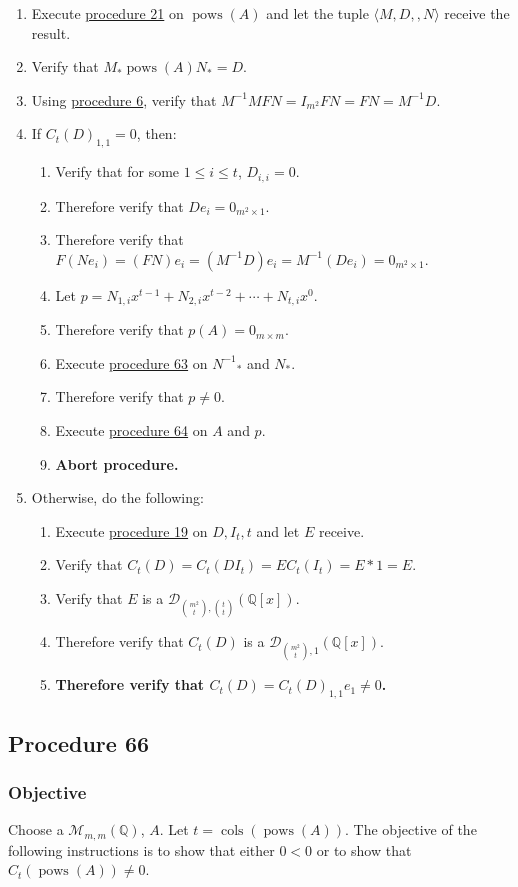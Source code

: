 \documentclass[twocolumn]{article}
\DeclareMathOperator{\pows}{pows}
\DeclareMathOperator{\cols}{cols}
\newcommand{\procedure}[2][]{\subsection*{Procedure #2 \ifthenelse{\equal{#1}{}}{}{(#1)}}\label{sec:procedure #2}}
\newcommand{\objective}{\subsubsection*{Objective}}
\begin{document}
				\begin{enumerate}
					\item Execute \hyperref[sec:procedure 21]{procedure 21} on $\pows(A)$ and let the tuple $\langle M,D,,N\rangle$ receive the result.
					\item Verify that $M_*\pows(A)N_*=D$.
					\item Using \hyperref[sec:procedure 6]{procedure 6}, verify that $M^{-1}MFN=I_{m^2}FN=FN=M^{-1}D$.
					\item If ${C_t(D)}_{1,1}=0$, then:
					\begin{enumerate}
						\item Verify that for some $1\le i\le t$, $D_{i,i}=0$.
						\item Therefore verify that $De_i=0_{m^2\times 1}$.
						\item Therefore verify that $F(Ne_i)=(FN)e_i=(M^{-1}D)e_i=M^{-1}(De_i)=0_{m^2\times 1}$.
						\item Let $p=N_{1,i}x^{t-1}+N_{2,i}x^{t-2}+\cdots+N_{t,i}x^0$.
						\item Therefore verify that $p(A)=0_{m\times m}$.
						\item Execute \hyperref[sec:procedure 63]{procedure 63} on ${N^{-1}}_*$ and $N_*$.
						\item Therefore verify that $p\ne 0$.
						\item Execute \hyperref[sec:procedure 64]{procedure 64} on $A$ and $p$.
						\item \textbf{Abort procedure.}
					\end{enumerate}
					\item Otherwise, do the following:
					\begin{enumerate}
						\item Execute \hyperref[sec:procedure 19]{procedure 19} on $D,I_t,t$ and let $E$ receive.
						\item Verify that $C_t(D)=C_t(DI_t)=EC_t(I_t)=E*1=E$.
						\item Verify that $E$ is a $\mathcal{D}_{\binom{m^2}{t},\binom{t}{t}}(\mathbb{Q}[x])$.
						\item Therefore verify that $C_t(D)$ is a $\mathcal{D}_{\binom{m^2}{t},1}(\mathbb{Q}[x])$.
						\item \textbf{Therefore verify that $C_t(D)={C_t(D)}_{1,1}e_1\ne 0$.}
					\end{enumerate}
				\end{enumerate}
		\procedure{66}
			\objective
				Choose a $\mathcal{M}_{m,m}(\mathbb{Q})$, $A$. Let $t=\cols(\pows(A))$. The objective of the following instructions is to show that either $0<0$ or to show that ${C_t(\pows(A))}\ne 0$.
\end{document}
